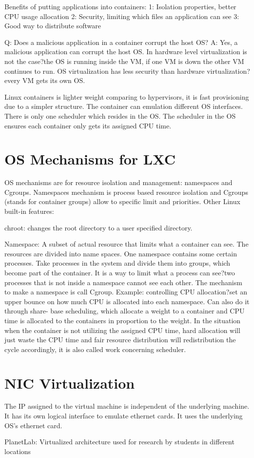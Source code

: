 \documentclass[twoside]{article}
\begin{document}
Benefits of putting applications into containers: 
1: Isolation properties, better CPU usage allocation
2: Security, limiting which files an application can see
3: Good way to distribute software

Q: Does a malicious application in a container corrupt the host OS?
A: Yes, a malicious application can corrupt the host OS. In hardware level virtualization is not the case?the OS is running inside the VM, if one VM is down the other VM continues to run. OS virtualization has less security than hardware virtualization?every VM gets its own OS. 

Linux containers is lighter weight comparing to hypervisors, it is fast provisioning due to a simpler structure. The container can emulation different OS interfaces. There is only one scheduler which resides in the OS. The scheduler in the OS ensures each container only gets its assigned CPU time.

\section{OS Mechanisms for LXC}

OS mechanisms are for resource isolation and management: namespaces and Cgroups. Namespaces mechanism is process based resource isolation and Cgroups (stands for container groups) allow to specific limit and priorities. Other Linux built-in features: 

chroot: changes the root directory to a user specified directory. 

Namespace: A subset of actual resource that limits what a container can see. The resources are divided into name spaces. One namespace contains some certain processes. Take processes in the system and divide them into groups, which become part of the container. It is a way to limit what a process can see?two processes that is not inside a namespace cannot see each other. The mechanism to make a namespace is call Cgroup. 
Example: controlling CPU allocation?set an upper bounce on how much CPU is allocated into each namespace. Can also do it through share- base scheduling, which allocate a weight to a container and CPU time is allocated to the containers in proportion to the weight. In the situation when the container is not utilizing the assigned CPU time, hard allocation will just waste the CPU time and fair resource distribution will redistribution the cycle accordingly, it is also called work concerning scheduler. 

\section{NIC Virtualization}

The IP assigned to the virtual machine is independent of the underlying machine. It has its own logical interface to emulate ethernet cards. It uses the underlying OS's ethernet card.

PlanetLab: Virtualized architecture used for research by students in different locations
\end{document}

